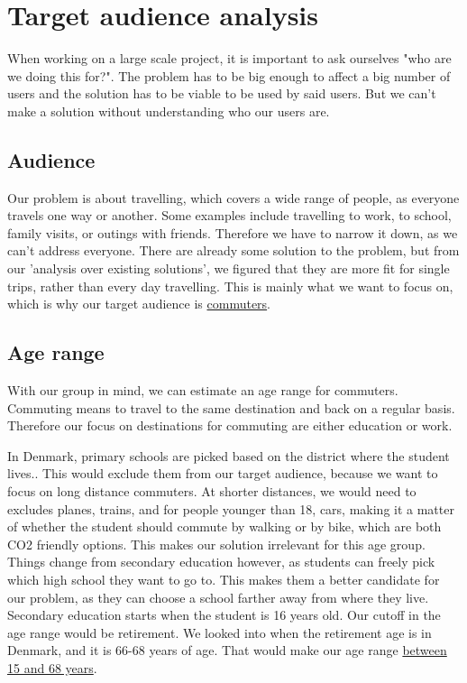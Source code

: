 \section{Target audience analysis}

When working on a large scale project, it is important to ask ourselves "who are we doing this for?". The problem has to be big enough to affect a big number of users and the solution has to be viable to be used by said users. But we can't make a solution without understanding who our users are. 

\subsection{Audience}

Our problem is about travelling, which covers a wide range of people, as everyone travels one way or another. Some examples include travelling to work, to school, family visits, or outings with friends. Therefore we have to narrow it down, as we can't address everyone. There are already some solution to the problem, but from our 'analysis over existing solutions', we figured that they are more fit for single trips, rather than every day travelling. This is mainly what we want to focus on, which is why our target audience is \underline{commuters}. 

\subsection{Age range}

With our group in mind, we can estimate an age range for commuters. Commuting means to travel to the same destination and back on a regular basis. Therefore our focus on destinations for commuting are either education or work. 

In Denmark, primary schools are picked based on the district where the student lives.\cite{primary_school}. This would exclude them from our target audience, because we want to focus on long distance commuters. At shorter distances, we would need to excludes planes, trains, and for people younger than 18, cars, making it a matter of whether the student should commute by walking or by bike, which are both CO2 friendly options. This makes our solution irrelevant for this age group. Things change from secondary education however, as students can freely pick which high school they want to go to. This makes them a better candidate for our problem, as they can choose a school farther away from where they live. Secondary education starts when the student is 16 years old.\cite{secondary_school} Our cutoff in the age range would be retirement. We looked into when the retirement age is in Denmark, and it is 66-68 years of age\cite{retirement}. That would make our age range \underline{between 15 and 68 years}.

